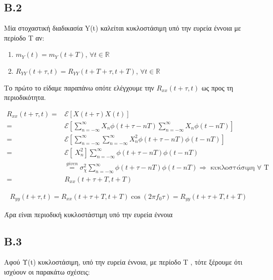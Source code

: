 \documentclass[11pt]{article}
\begin{document}
    \subsection*{B.2}
    Μία στοχαστική διαδικασία Y(t) καλείται κυκλοστάσιμη υπό την ευρεία έννοια με περίοδο T αν:
    
    \begin{enumerate}
      \item $m_Y (t) = m_Y (t + T )$, \space $\forall t \in \mathbb{R}$
      \item $R_{YY} (t + τ, t) = R_{YY} (t + T + τ, t + T )$, \space $\forall t \in \mathbb{R}$
    \end{enumerate}

    \par \noindent
    Το πρώτο το είδαμε παραπάνω οπότε ελέγχουμε την $R_{xx}(t+\tau,t)$ ως προς τη περιοδικότητα.
    
    \begin{align}
        R_{xx}(t+\tau,t) =& \mathcal{E}[X(t+\tau)X(t)] \nonumber \\
        =& \mathcal{E}\left[ \sum_{n=-\infty}^{\infty} X_n \phi(t+\tau-nT) \sum_{n=-\infty}^{\infty} X_n \phi(t-nT) \right] \nonumber \\
        =& \mathcal{E}\left[\sum_{n=-\infty}^{\infty} \sum_{n=-\infty}^{\infty} X_n^2 \phi(t+\tau-nT) \phi(t-nT)  \right] \nonumber \\
        =& \mathcal{E}\left[\ X_n^2 \right] \sum_{n=-\infty}^{\infty} \phi(t+\tau-nT) \phi(t-nT) \nonumber \\
        &\overset{given}{=} \boxed{ σ_χ^2 \sum_{n=-\infty}^{\infty} \phi(t+\tau-nT) \phi(t-nT)}  \Rightarrow \mbox{ κυκλοστάσιμη } \forall \mbox{ T} \label{R-xx} \\ 
        =& R_{xx}(t+\tau+T,t+T) \nonumber
    \end{align}
    
    \begin{align}
        \boxed{R_{yy}(t+\tau,t) = R_{xx}(t+\tau+T,t+T)\cos(2\pi f_0\tau) = R_{yy}(t+\tau+T,t+T)}
    \end{align}
    
    \par \noindent
    Άρα είναι περιοδική κυκλοστάστιμη υπό την ευρεία έννοια
    
    \subsection*{B.3}
    Αφού Υ(t) κυκλοστάσιμη, υπό την ευρεία έννοια, με περίοδο T , τότε ξέρουμε ότι ισχύουν οι παρακάτω σχέσεις:
    
\end{document}
